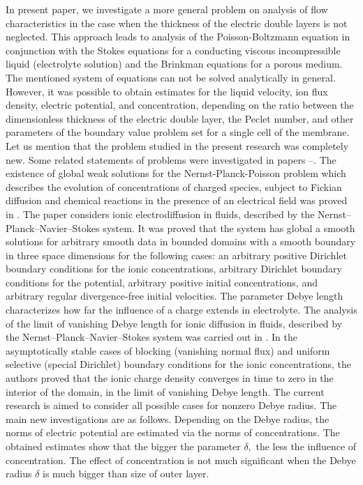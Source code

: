 \documentclass{amsart}
\begin{document}
In present paper, we investigate a more general problem on analysis of flow characteristics in the case when the thickness of the electric double layers is not neglected.  This approach leads to analysis of the Poisson-Boltzmann equation in conjunction with the Stokes equations for a conducting viscous incompressible liquid (electrolyte solution) and the Brinkman equations for a porous medium. The mentioned system of equations can not be solved analytically in general. However,  it was possible to obtain estimates for the liquid velocity, ion flux density, electric potential, and concentration, depending on the ratio between the dimensionless thickness of the electric double layer, the Peclet number, and other parameters of the boundary value problem set for a single cell of the membrane.
Let us mention that the problem studied in the present research was completely new. Some  related statements of problems were investigated in papers \cite{rel1} --\cite{rel3}. The existence of global weak solutions for the Nernst-Planck-Poisson problem which
describes the evolution of concentrations of charged species, subject to Fickian diffusion
and chemical reactions in the presence of an electrical field was proved in \cite{rel1}. The paper \cite{rel2} considers ionic electrodiffusion in fluids, described by the Nernst–Planck–Navier–Stokes system. It was proved that the system has global a smooth solutions for
arbitrary smooth data in bounded domains with a smooth boundary in three space
dimensions for the following cases: an arbitrary positive Dirichlet boundary conditions for the ionic concentrations, arbitrary Dirichlet boundary
conditions for the potential, arbitrary positive initial concentrations, and arbitrary
regular divergence-free initial velocities. The parameter Debye length characterizes how far the influence of a charge extends in electrolyte. The analysis of the limit of vanishing Debye length for ionic diffusion in fluids, described by the Nernst–Planck–Navier–Stokes system was carried out in \cite{rel3}. In the asymptotically stable
cases of blocking (vanishing normal flux) and uniform selective (special Dirichlet)
boundary conditions for the ionic concentrations, the authors proved that the ionic charge
density  converges in time to zero in the interior of the domain, in the limit of
vanishing Debye length.
The current research is aimed to consider all possible cases for nonzero Debye radius. The main new investigations are as follows. Depending on the Debye radius, the norms of electric potential are estimated via the norms of concentrations. The obtained estimates show that the bigger the parameter $\delta,$ the less the influence of concentration. The effect of concentration is not much significant when the Debye radius $\delta$ is much bigger than size of outer layer. 
\end{document}

